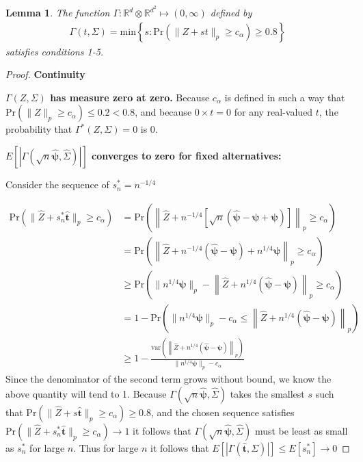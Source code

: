 \documentclass{article}
\newtheorem{lemma}[theorem]{Lemma}
\newcommand{\tst}{\hat{\boldsymbol{t}}}
\newcommand{\rvv}{Z}
\newcommand{\gamestp}{\Gamma(\sqrt{n}\hat{\boldsymbol{\psi}}, \hat{\Sigma})}
\newcommand{\gamz}{\Gamma(\rvv, \Sigma)}
\newcounter{conditions}
\begin{document}
\begin{lemma}
	\label{lemma:mult_dist_gam}
	The function $\Gamma : \mathbb{R}^d \otimes \mathbb{R}^{d^2} \mapsto (0, \infty)$ defined by
	\begin{align*}
		\Gamma(t, \Sigma) = \text{min}\left\{s : \text{Pr}(\|Z + st\|_p \geq c_\alpha) \geq 0.8 \right\}
	\end{align*}
	satisfies conditions 1-5.
\end{lemma}

\begin{proof}
\textbf{Continuity}

\textbf{$\gamz$ has measure zero at zero.}
	Because $c_{\alpha}$ is defined in such a way that $\text{Pr}(\|Z\|_p \geq c_\alpha) \leq 0.2 < 0.8$, and because $0 \times t = 0$ for any real-valued $t$, the probability that $\Gamma^*(Z, \Sigma) = 0$ is 0.

\textbf{$E\left[|\gamestp|\right]$ converges to zero for fixed alternatives:}

Consider the sequence of $s_n^* = n^{- 1/4}$

\begin{align*}
 \text{Pr}(\|\hat{Z} + s_n^{*}\tst\|_p \geq c_\alpha) &= \text{Pr}\left(\left\|\hat{Z} + n^{-1/4}\left[\sqrt{n}\left(\hat{\boldsymbol{\psi}} - \boldsymbol{\psi} + \boldsymbol{\psi}\right)\right]\right\|_p \geq c_\alpha\right)\\
 &= \text{Pr}\left(\left\|\hat{Z} + n^{-1/4}\left(\hat{\boldsymbol{\psi}} - \boldsymbol{\psi}\right) + n^{1/4}\boldsymbol{\psi}\right\|_p \geq c_\alpha\right)\\
 &\geq \text{Pr}\left( \|n^{1/4}\boldsymbol{\psi}\|_p - \left\|\hat{Z} + n^{1/4}\left(\hat{\boldsymbol{\psi}} - \boldsymbol{\psi}\right) \right\|_p \geq c_\alpha\right)\\
 & = 1 - \text{Pr}\left( \|n^{1/4}\boldsymbol{\psi}\|_p - c_\alpha \leq \left\|\hat{Z} + n^{1/4}\left(\hat{\boldsymbol{\psi}} - \boldsymbol{\psi}\right) \right\|_p \right)\\
 & \geq 1 - \frac{\text{var}\left(\left\|\hat{Z} + n^{1/4}\left(\hat{\boldsymbol{\psi}} - \boldsymbol{\psi}\right) \right\|_p\right)}{\|n^{1/4}\boldsymbol{\psi}\|_p - c_\alpha} 
\end{align*}
Since the denominator of the second term grows without bound, we know the above quantity will tend to 1. Because  $\gamestp$ takes the smallest $s$ such that $\text{Pr}(\|\hat{Z} + s\tst\|_p \geq c_\alpha) \geq 0.8$, and the chosen sequence satisfies $\text{Pr}(\|\hat{Z} + s_n^*\tst\|_p \geq c_\alpha) \rightarrow 1$ it follows that $\gamestp$ must be least as small as $s_n^*$ for large $n$.   Thus for large $n$ it follows that $E\left[|\Gamma(\tst, \Sigma) | \right] \leq E\left[s_n^*\right]\rightarrow 0$


\end{proof}
\end{document}
